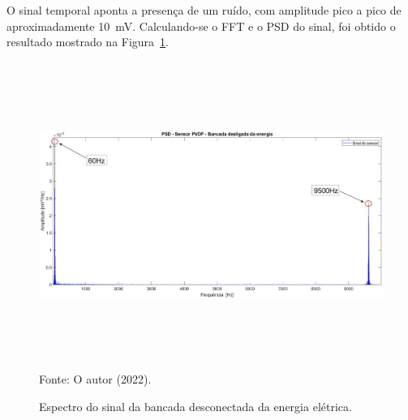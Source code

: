 \documentclass[
	12pt,				
	oneside,			
	a4paper,			
	english,			
	brazil,			
	]{abntex2ppgsi}
\begin{document}
O sinal temporal aponta a presença de um ruído, com amplitude pico a pico de aproximadamente {\SI{10}{\milli\volt}}. Calculando-se o FFT e o PSD do sinal, foi obtido o resultado mostrado na Figura~\ref{PSD_SENSOR_MAQUINA_DESLIGADA}. 

\begin{figure}[H]
\centering
\caption {Espectro do sinal da bancada desconectada da energia elétrica.}
\includegraphics[width=\textwidth,height=100mm,keepaspectratio]{PSD_PVDF_MAQUINA_DESLIGADA} \\
Fonte: O autor (2022).
\label{PSD_SENSOR_MAQUINA_DESLIGADA}
\end{figure} 
\end{document}
